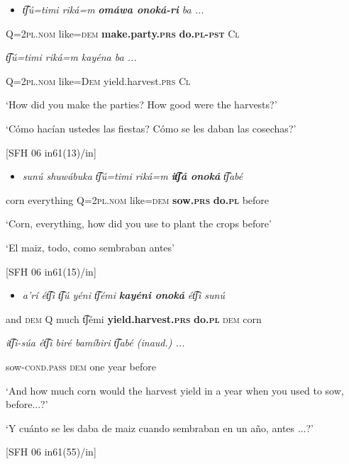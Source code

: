 \begin{itemize}
\item \textit{t͡ʃú=timi  riká=m} \textbf{\textit{omáwa     onoká-ri} } \textit{ba ...} 
\end{itemize}

   Q=2\textsc{pl.nom}  like=\textsc{dem}  \textbf{make.party.\textsc{prs}} \textbf{do.\textsc{pl}}\textbf{{}-}\textbf{\textsc{pst} }\textsc{Cl}  

  \textit{t͡ʃú=timi   riká=m   kayéna       ba   ...}

  Q=2\textsc{pl.nom}  like=\textsc{Dem}   yield.harvest\textsc{.prs}  \textsc{Cl}

‘How did you make the parties? How good were the harvests?’

  ‘Cómo hacían ustedes las fiestas? Cómo se les daban las cosechas?’

 [SFH 06 in61(13)/in]

\begin{itemize}
\item \textit{sunú   shuwábuka   t͡ʃú=timi   riká=m} \textbf{\textit{it͡ʃá     onoká} }\textit{t͡ʃabé}
\end{itemize}

  corn  everything  Q=2\textsc{pl.nom}  like=\textsc{dem}  \textbf{sow.\textsc{prs}} \textbf{do\textsc{.pl}}  before

  ‘Corn, everything, how did you use to plant the crops before’

‘El maiz, todo, como sembraban antes’

  [SFH 06 in61(15)/in]

\begin{itemize}
\item \textit{a’rí   ét͡ʃi   t͡ʃú   yéni   t͡ʃémi} \textbf{\textit{kayéni       onoká} }\textit{ét͡ʃi   sunú}    
\end{itemize}

  and  \textsc{dem}  Q  much  t͡ʃémi  \textbf{yield.harvest.\textsc{prs}} \textbf{do\textsc{.pl}}  \textsc{dem}  corn  

\textit{it͡ʃi-súa     ét͡ʃi   biré   bamíbiri   t͡ʃabé  (inaud.) ...}

  sow-\textsc{cond.pass}  \textsc{dem}  one  year    before

  ‘And how much corn would the harvest yield in a year when you used to sow, before...?’

‘Y cuánto se les daba de maiz cuando sembraban en un año, antes ...?’

  [SFH 06 in61(55)/in]

